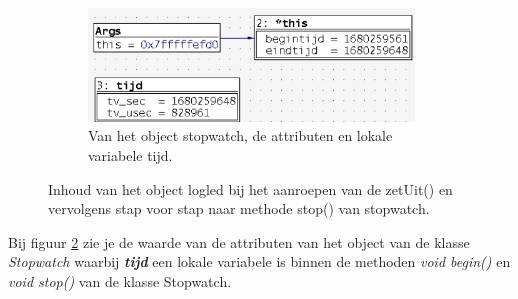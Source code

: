 \begin{enumerate}[label=\alph*]
\begin{figure}[h!]
\begin{center}
\begin{subfigure}[b]{0.49\textwidth}
			\label{fig:logObjectA}
		\end{subfigure}
		\begin{subfigure}[b]{0.49\textwidth}
			\includegraphics[width=0.95\textwidth]{figuren/ddd_logled_p2b}
			\caption{Van het object stopwatch, de attributen en lokale variabele tijd.}
			\label{fig:logObjectB}
		\end{subfigure}
		\caption{Inhoud van het object logled bij het aanroepen van de  zetUit() en vervolgens stap voor stap naar methode stop() van stopwatch.}
		\label{fig:logledOjecten}   
	\end{center}
\end{figure}
Bij figuur \ref{fig:logObjectB} zie je de waarde van de attributen van het object van de klasse \textit{Stopwatch} waarbij \textit{\textbf{tijd}} een lokale variabele is binnen de methoden \textit{void begin()} en \textit{void stop()} van de klasse Stopwatch.
\end{enumerate}
\newpage
